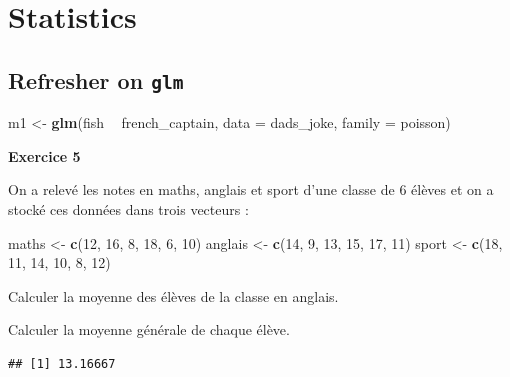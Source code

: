 \documentclass[
  12pt,
]{book}
\newenvironment{Shaded}{\begin{snugshade}}{\end{snugshade}}
\newcommand{\DataTypeTok}[1]{\textcolor[rgb]{0.13,0.29,0.53}{#1}}
\newcommand{\DecValTok}[1]{\textcolor[rgb]{0.00,0.00,0.81}{#1}}
\newcommand{\KeywordTok}[1]{\textcolor[rgb]{0.13,0.29,0.53}{\textbf{#1}}}
\newcommand{\NormalTok}[1]{#1}
\newcommand{\OperatorTok}[1]{\textcolor[rgb]{0.81,0.36,0.00}{\textbf{#1}}}
\newcommand{\StringTok}[1]{\textcolor[rgb]{0.31,0.60,0.02}{#1}}
\begin{document}
\hypertarget{part-statistics}{%
\part{Statistics}\label{part-statistics}}

\hypertarget{refresher-on-glm}{%
\chapter{\texorpdfstring{Refresher on \texttt{glm}}{Refresher on glm}}\label{refresher-on-glm}}

\begin{Shaded}
\begin{Highlighting}[]
\NormalTok{m1 <-}\StringTok{ }\KeywordTok{glm}\NormalTok{(fish }\OperatorTok{~}\StringTok{ }\NormalTok{french_captain, }\DataTypeTok{data =}\NormalTok{ dads_joke, }\DataTypeTok{family =}\NormalTok{ poisson)}
\end{Highlighting}
\end{Shaded}

\textbf{Exercice 5}

On a relevé les notes en maths, anglais et sport d'une classe de 6 élèves et on a stocké ces données dans trois vecteurs :

\begin{Shaded}
\begin{Highlighting}[]
\NormalTok{maths <-}\StringTok{ }\KeywordTok{c}\NormalTok{(}\DecValTok{12}\NormalTok{, }\DecValTok{16}\NormalTok{, }\DecValTok{8}\NormalTok{, }\DecValTok{18}\NormalTok{, }\DecValTok{6}\NormalTok{, }\DecValTok{10}\NormalTok{)}
\NormalTok{anglais <-}\StringTok{ }\KeywordTok{c}\NormalTok{(}\DecValTok{14}\NormalTok{, }\DecValTok{9}\NormalTok{, }\DecValTok{13}\NormalTok{, }\DecValTok{15}\NormalTok{, }\DecValTok{17}\NormalTok{, }\DecValTok{11}\NormalTok{)}
\NormalTok{sport <-}\StringTok{ }\KeywordTok{c}\NormalTok{(}\DecValTok{18}\NormalTok{, }\DecValTok{11}\NormalTok{, }\DecValTok{14}\NormalTok{, }\DecValTok{10}\NormalTok{, }\DecValTok{8}\NormalTok{, }\DecValTok{12}\NormalTok{)}
\end{Highlighting}
\end{Shaded}

Calculer la moyenne des élèves de la classe en anglais.

Calculer la moyenne générale de chaque élève.

\begin{verbatim}
## [1] 13.16667
\end{verbatim}
\end{document}
